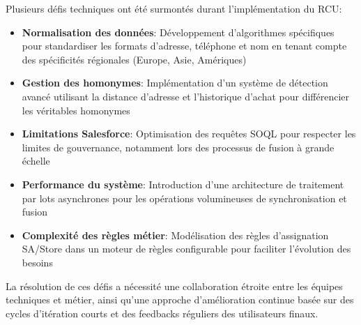 \begin{mdframed}[style=breakablegreen]
Plusieurs défis techniques ont été surmontés durant l'implémentation du RCU:

\begin{itemize}
    \item \textbf{Normalisation des données}: Développement d'algorithmes spécifiques pour standardiser les formats d'adresse, téléphone et nom en tenant compte des spécificités régionales (Europe, Asie, Amériques)
    
    \item \textbf{Gestion des homonymes}: Implémentation d'un système de détection avancé utilisant la distance d'adresse et l'historique d'achat pour différencier les véritables homonymes
    
    \item \textbf{Limitations Salesforce}: Optimisation des requêtes SOQL pour respecter les limites de gouvernance, notamment lors des processus de fusion à grande échelle
    
    \item \textbf{Performance du système}: Introduction d'une architecture de traitement par lots asynchrones pour les opérations volumineuses de synchronisation et fusion
    
    \item \textbf{Complexité des règles métier}: Modélisation des règles d'assignation SA/Store dans un moteur de règles configurable pour faciliter l'évolution des besoins
\end{itemize}
\end{mdframed}

La résolution de ces défis a nécessité une collaboration étroite entre les équipes techniques et métier, ainsi qu'une approche d'amélioration continue basée sur des cycles d'itération courts et des feedbacks réguliers des utilisateurs finaux.
